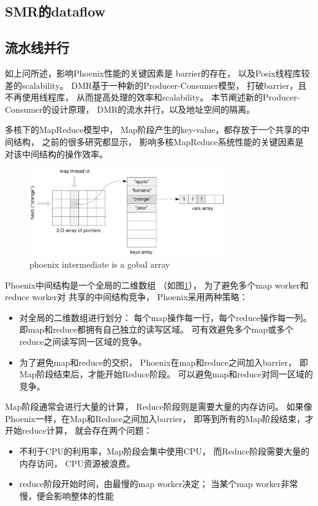 \subsection{SMR的dataflow}
\subsection{流水线并行}
如上问所述，影响Phoenix性能的关键因素是
barrier的存在，
以及Posix线程库较差的scalability。
DMR基于一种新的Producer-Consumer模型，
打破barrier，且不再使用线程库，
从而提高处理的效率和scalability。
本节阐述新的Producer-Consumer的设计原理，
DMR的流水并行，以及地址空间的隔离。

多核下的MapReduce模型中，
Map阶段产生的key-value，都存放于一个共享的中间结构，
之前的很多研究都显示，
影响多核MapReduce系统性能的关键因素是
对该中间结构的操作效率\cite{mao2010metis}。
\begin{figure}[!h!t]  
    \centering
    \includegraphics[width=0.75\textwidth]{img/phoenix_intermediate.eps}
    \caption{phoenix intermediate is a gobal array}
    \label{phoenix:intermediate}
\end{figure}

Phoenix中间结构是一个全局的二维数组
（如图\ref{phoenix:intermediate}），
为了避免多个map worker和reduce worker对
共享的中间结构竞争，
Phoenix采用两种策略：
\begin{itemize}
  \item 对全局的二维数组进行划分：
  每个map操作每一行，每个reduce操作每一列。
  即map和reduce都拥有自己独立的读写区域。
  可有效避免多个map或多个reduce之间读写同一区域的竞争。
  
  \item 为了避免map和reduce的交织，
  Phoenix在map和reduce之间加入barrier，
  即Map阶段结束后，才能开始Reduce阶段。
  可以避免map和reduce对同一区域的竞争。
\end{itemize}

Map阶段通常会进行大量的计算，
Reduce阶段则是需要大量的内存访问。
如果像Phoenix一样，在Map和Reduce之间加入barrier，
即等到所有的Map阶段结束，才开始reduce计算，
就会存在两个问题：
\begin{itemize}
  \item 不利于CPU的利用率，Map阶段会集中使用CPU，
  而Reduce阶段需要大量的内存访问，
  CPU资源被浪费。
  \item reduce阶段开始时间，由最慢的map worker决定；
  当某个map worker非常慢，便会影响整体的性能
\end{itemize}

